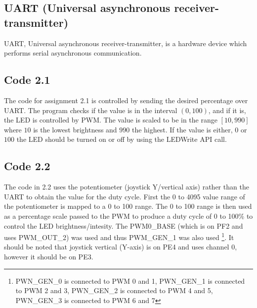 \subsection{UART (Universal asynchronous receiver-transmitter)}
UART, Universal asynchronous receiver-transmitter, is a hardware device which performs serial asynchronous communication. 


\subsection{Code 2.1}
The code for assignment 2.1 is controlled by sending the desired percentage over UART. The program checks if the value is in the interval $(0, 100)$, and if it is, the LED is controlled by PWM. The value is scaled to be in the range $[10, 990]$ where $10$ is the lowest brightness and $990$ the highest. If the value is either, $0$ or $100$ the LED should be turned on or off by using the LEDWrite API call.

\subsection{Code 2.2}
The code in 2.2 uses the potentiometer (joystick Y/vertical axis) rather than the UART to obtain the value for the duty cycle. First the 0 to 4095 value range of the potentiometer is mapped to a 0 to 100 range. The 0 to 100 range is then used as a percentage scale passed to the PWM to produce a duty cycle of 0 to 100\% to control the LED brightness/intesity. The PWM0\_BASE (which is on PF2 and uses PWM\_OUT\_2) was used and thus PWM\_GEN\_1 was also used \footnote{PWN\_GEN\_0 is connected to PWM 0 and 1, PWN\_GEN\_1 is connected to PWM 2 and 3, PWN\_GEN\_2 is connected to PWM 4 and 5, PWN\_GEN\_3 is connected to PWM 6 and 7}. It should be noted that joystick vertical (Y-axis) is on PE4 and uses channel 0, however it should be on PE3.

